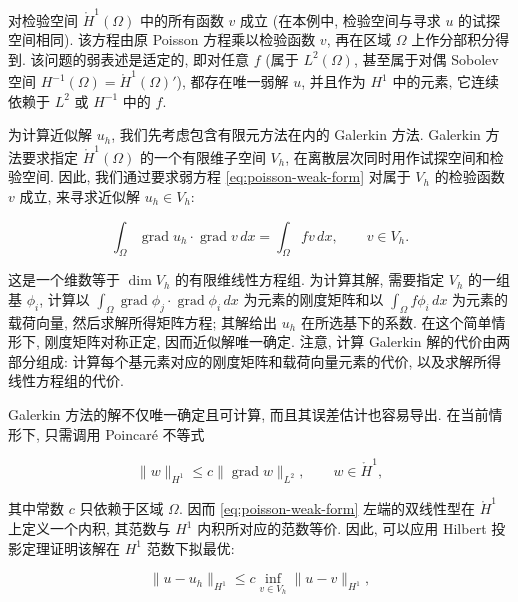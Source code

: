 {对检验空间 $\mathring H^1(\Omega)$ 中的所有函数 $v$ 成立 (在本例中, 检验空间与寻求 $u$ 的试探空间相同). 该方程由原 Poisson 方程乘以检验函数 $v$, 再在区域 $\Omega$ 上作分部积分得到. 该问题的弱表述是适定的, 即对任意 $f$ (属于 $L^2(\Omega)$, 甚至属于对偶 Sobolev 空间 $H^{-1}(\Omega)=\mathring H^1(\Omega)'$), 都存在唯一弱解 $u$, 并且作为 $H^1$ 中的元素, 它连续依赖于 $L^2$ 或 $H^{-1}$ 中的 $f$.}

{为计算近似解 $u_h$, 我们先考虑包含有限元方法在内的 Galerkin 方法. Galerkin 方法要求指定 $\mathring H^1(\Omega)$ 的一个有限维子空间 $V_h$, 在离散层次同时用作试探空间和检验空间. 因此, 我们通过要求弱方程 \eqref{eq:poisson-weak-form} 对属于 $V_h$ 的检验函数 $v$ 成立, 来寻求近似解 $u_h\in V_h$:}

\begin{equation}\label{eq:poisson-galerkin-form}
\int_\Omega\operatorname{grad}u_h\cdot\operatorname{grad}v\,dx=\int_\Omega fv\,dx,\qquad v\in V_h.
\end{equation}

{这是一个维数等于 $\dim V_h$ 的有限维线性方程组. 为计算其解, 需要指定 $V_h$ 的一组基 $\phi_i$, 计算以 $\int_\Omega\operatorname{grad}\phi_j\cdot\operatorname{grad}\phi_i\,dx$ 为元素的刚度矩阵和以 $\int_\Omega f\phi_i\,dx$ 为元素的载荷向量, 然后求解所得矩阵方程; 其解给出 $u_h$ 在所选基下的系数. 在这个简单情形下, 刚度矩阵对称正定, 因而近似解唯一确定. 注意, 计算 Galerkin 解的代价由两部分组成: 计算每个基元素对应的刚度矩阵和载荷向量元素的代价, 以及求解所得线性方程组的代价.}

{Galerkin 方法的解不仅唯一确定且可计算, 而且其误差估计也容易导出. 在当前情形下, 只需调用 Poincaré 不等式}

\[
\|w\|_{H^1}\le c\|\operatorname{grad}w\|_{L^2},\qquad w\in\mathring H^1,
\]

{其中常数 $c$ 只依赖于区域 $\Omega$. 因而 \eqref{eq:poisson-weak-form} 左端的双线性型在 $\mathring H^1$ 上定义一个内积, 其范数与 $H^1$ 内积所对应的范数等价. 因此, 可以应用 Hilbert 投影定理证明该解在 $H^1$ 范数下拟最优:}

\begin{equation}\label{eq:galerkin-quasioptimality}
\|u-u_h\|_{H^1}\le c\inf_{v\in V_h}\|u-v\|_{H^1},
\end{equation}

